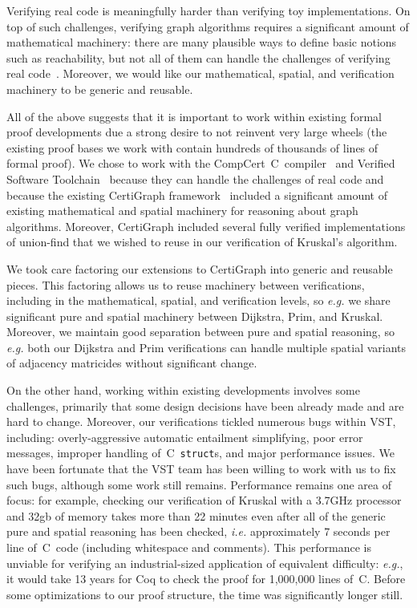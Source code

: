 Verifying real code is meaningfully harder than verifying toy implementations.  On top of such challenges, verifying graph algorithms requires a significant amount of mathematical machinery: there are many plausible ways to define basic notions such as reachability, but not all of them can handle the challenges of verifying real code~\cite{shengyi:thesis}.  Moreover, we would like our mathematical, spatial, and verification machinery to be generic and reusable.

All of the above suggests that it is important to work within existing formal proof developments due a strong desire to not reinvent very large wheels (the existing proof bases we work with contain hundreds of thousands of lines of formal proof).  We chose to work with the CompCert~C~compiler~\cite{leroy:compcert} and Verified Software Toolchain~\cite{appel:programlogics} because they can handle the challenges of real code and because the existing CertiGraph framework~\cite{DBLP:journals/pacmpl/WangCMH19} included a significant amount of existing mathematical and spatial machinery for reasoning about graph algorithms.  Moreover, CertiGraph included several fully verified implementations of union-find that we wished to reuse in our verification of Kruskal's algorithm.

We took care factoring our extensions to CertiGraph into generic and reusable pieces.  This factoring allows us to reuse machinery between verifications, including in the mathematical, spatial, and verification levels, so \emph{e.g.} we share significant pure and spatial machinery between Dijkstra, Prim, and Kruskal.  Moreover, we maintain good separation between pure and spatial reasoning, so \emph{e.g.} both our Dijkstra and Prim verifications can handle multiple spatial variants of adjacency matricides without significant change.

On the other hand, working within existing developments involves some challenges, primarily that some design decisions have been already made and are hard to change.  Moreover, our verifications tickled numerous bugs within VST, including: overly-aggressive automatic entailment simplifying, poor error messages, improper handling of~C~\texttt{struct}s, and major performance issues.  We have been fortunate that the VST team has been willing to work with us to fix such bugs, although some work still remains.  Performance remains one area of focus: for example, checking our verification of Kruskal with a 3.7GHz processor and 32gb of memory takes more than 22 minutes even after all of the generic pure and spatial reasoning has been checked, \emph{i.e.} approximately 7 seconds per line of~C~code (including whitespace and comments).  This performance is unviable for verifying an industrial-sized application of equivalent difficulty: \emph{e.g.}, it would take 13 years for Coq to check the proof for 1,000,000 lines of~C.  Before some optimizations to our proof structure, the time was significantly longer still.

